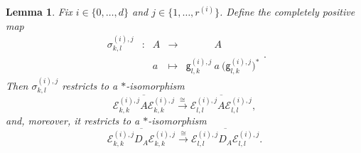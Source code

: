 \documentclass[a4paper]{amsart}
\numberwithin{equation}{section}
\newcommand{\Ecal}{\mathcal{E}}
\newcommand{\rAr}{\longrightarrow}
\newcommand{\unMatImg}[3]{{\Ecal_{#3}^{(#1), #2}}}
\newcommand{\gUnMatImg}[3]{{ \mathsf{g}_{#3}^{(#1), #2}}}
\theoremstyle{plain}
\newtheorem{lem}[thm]{Lemma}
\theoremstyle{indented}
\numberwithin{equation}{section}
\theoremstyle{definition}
\theoremstyle{remark}
\theoremstyle{plain}
\theoremstyle{definition}
\begin{document}
\begin{lem}  \label{lem:orderZeroDecomp} 
     Fix ${i\in \{0,\hdots,d\}}$ and ${j\in \{ 1,\hdots,r^{(i)}\}}$. 
     Define the completely positive map
     \[
     \begin{array}{ccccl}
       \sigma_{k,l}^{(i),j} & \colon & A & \rAr  & \phantom{\gUnMatImg{i}{j}{l,k}} ~ A   \\
       & & a & \longmapsto & \gUnMatImg{i}{j}{l,k} ~ a  ~ \big(\gUnMatImg{i}{j}{l,k}\big)^{\ast}  
     \end{array}.
     \]
    Then $\sigma_{k,l}^{(i),j}$ restricts to a ${\ast}$-isomorphism
    \[\overline{\unMatImg{i}{j}{k,k} A \unMatImg{i}{j}{k,k}} \overset{\cong}{\longrightarrow} \overline{\unMatImg{i}{j}{l,l} A \unMatImg{i}{j}{l,l}}, \]
    and, moreover, it restricts to a ${\ast}$-isomorphism
    \[ \overline{\unMatImg{i}{j}{k,k} D_A \unMatImg{i}{j}{k,k}} \overset{\cong}{\longrightarrow} \overline{\unMatImg{i}{j}{l,l} D_A \unMatImg{i}{j}{l,l}}. \]
\end{lem}
\end{document}
